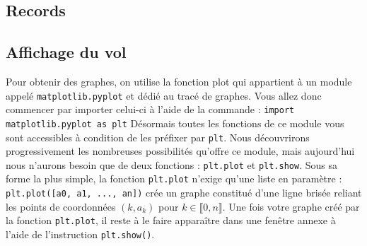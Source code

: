 \subsection*{Records}




\subsection*{Affichage du vol}

Pour obtenir des graphes, on utilise la fonction plot qui appartient à un module appelé
\texttt{matplotlib.pyplot} et dédié au tracé de graphes. Vous allez donc commencer par importer celui-ci à l’aide de la
commande :
\texttt{import matplotlib.pyplot as plt}
Désormais toutes les fonctions de ce module vous sont accessibles à condition de les préfixer par \texttt{plt}. Nous découvrirons
progressivement les nombreuses possibilités qu’offre ce module, mais aujourd’hui nous n’aurons besoin que de deux
fonctions : \texttt{plt.plot} et \texttt{plt.show}.
Sous sa forme la plus simple, la fonction \texttt{plt.plot} n’exige qu’une liste en paramètre : \texttt{plt.plot([a0, a1, ..., an])}
crée un graphe constitué d’une ligne brisée reliant les points de coordonnées $(k,a_k
)$ pour $k \in  \llbracket 0,n \rrbracket$.
Une fois votre graphe créé par la fonction \texttt{plt.plot}, il reste à le faire apparaître dans une fenêtre annexe à l’aide de
l’instruction \texttt{plt.show()}.



